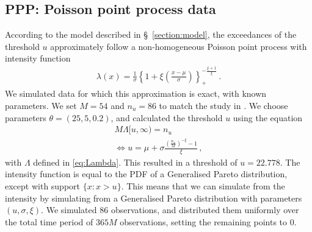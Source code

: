 \documentclass{article}
\begin{document}
\subsection{PPP: Poisson point process data}
%

%
According to the model described in \S~\ref{section:model},
the exceedances of the threshold $u$ approximately
follow a non-homogeneous Poisson point process with intensity function
%
\begin{align*}
	\lambda(x) = \frac{1}{\sigma}
		\left\{1 + \xi \left(\frac{x - \mu}{\sigma}\right)\right\}_+
		^ {-\frac{\xi + 1}{\xi}} \,.
\end{align*}
%
We simulated data for which this approximation is exact,
with known parameters.
We set $M = 54$ and $n_u = 86$
to match the study in \cite{coles1996}.
We choose parameters $\theta = (25, 5, 0.2)$,
and calculated the threshold $u$ using the equation
%
\begin{align*}
	M \Lambda[u, \infty) = n_u \\
	\iff u = \mu + \sigma \frac{\left(\frac{n_u}{M}\right)
		^ {-\xi} - 1}{\xi} \,,
\end{align*}
%
with $\Lambda$ defined in \eqref{eq:Lambda}.
This resulted in a threshold of $u = 22.778$.
The intensity function is equal to the PDF
of a Generalised Pareto distribution,
except with support $\{x \colon x > u\}$.
This means that we can simulate from the intensity
by simulating from a Generalised Pareto distribution
with parameters $(u, \sigma, \xi)$.
We simulated $86$ observations, and distributed them uniformly
over the total time period of $365 M$ observations,
setting the remaining points to $0$.
%
\end{document}
